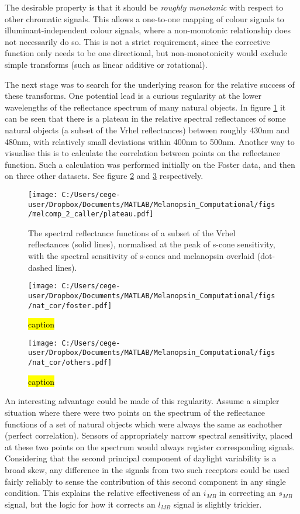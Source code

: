 \documentclass{article}
\begin{document}
The desirable property is that it should be \emph{roughly monotonic} with respect to other chromatic signals. This allows a one-to-one mapping of colour signals to illuminant-independent colour signals, where a non-monotonic relationship does not necessarily do so. This is not a strict requirement, since the corrective function only needs to be one directional, but non-monotonicity would exclude simple transforms (such as linear additive or rotational).

The next stage was to search for the underlying reason for the relative success of these transforms. One potential lead is a curious regularity at the lower wavelengths of the reflectance spectrum of many natural objects. In figure \ref{fig:plateau} it can be seen that there is a plateau in the relative spectral reflectances of some natural objects (a subset of the Vrhel reflectances) between roughly 430nm and 480nm, with relatively small deviations within 400nm to 500nm. Another way to visualise this is to calculate the correlation between points on the reflectance function. Such a calculation was performed initially on the Foster data, and then on three other datasets. See figure \ref{fig:foster} and \ref{fig:others} respectively.

\begin{figure}[h]
    \centering
    \texttt{[image: C:/Users/cege-user/Dropbox/Documents/MATLAB/Melanopsin\_Computational/figs/melcomp\_2\_caller/plateau.pdf]}
    \caption{The spectral reflectance functions of a subset of the Vrhel reflectances (solid lines), normalised at the peak of s-cone sensitivity, with the spectral sensitivity of s-cones and melanopsin overlaid (dot-dashed lines).}
    \label{fig:plateau}
\end{figure} 

\begin{figure}[h]
    \centering
    \texttt{[image: C:/Users/cege-user/Dropbox/Documents/MATLAB/Melanopsin\_Computational/figs/nat\_cor/foster.pdf]}
    \caption{\hl{caption}}
    \label{fig:foster}
\end{figure} 

\begin{figure}[h]
    \centering
    \texttt{[image: C:/Users/cege-user/Dropbox/Documents/MATLAB/Melanopsin\_Computational/figs/nat\_cor/others.pdf]}
    \caption{\hl{caption}}
    \label{fig:others}
\end{figure} 

An interesting advantage could be made of this regularity. Assume a simpler situation where there were two points on the spectrum of the reflectance functions of a set of natural objects which were always the same as eachother (perfect correlation). Sensors of appropriately narrow spectral sensitivity, placed at these two points on the spectrum would always register corresponding signals. Considering that the second principal component of daylight variability is a broad skew, any difference in the signals from two such receptors could be used fairly reliably to sense the contribution of this second component in any single condition. This explains the relative effectiveness of an $i_{MB}$ in correcting an $s_{MB}$ signal, but the logic for how it corrects an $l_{MB}$ signal is slightly trickier.
\end{document}
